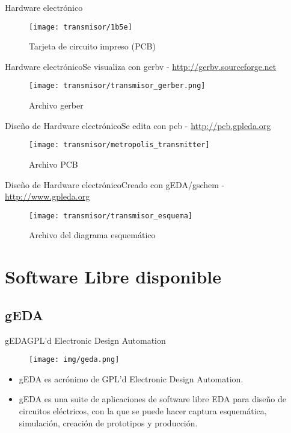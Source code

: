 \message{ !name(alternativa.tex)}\documentclass{beamer}
\begin{document}
\begin{frame}{Hardware electrónico}
  \begin{figure}
    \texttt{[image: transmisor/1b5e]}
    \caption{Tarjeta de circuito impreso (PCB)}
  \end{figure}
\end{frame}

\begin{frame}{Hardware electrónico}{Se visualiza con \alert{gerbv} - \url{http://gerbv.sourceforge.net}}
  \begin{figure}
    \texttt{[image: transmisor/transmisor\_gerber.png]}
    \caption{Archivo gerber}
  \end{figure}
\end{frame}

\begin{frame}{Diseño de Hardware electrónico}{Se edita con \alert{pcb} - \url{http://pcb.gpleda.org}}
  \begin{figure}
    \texttt{[image: transmisor/metropolis\_transmitter]}
    \caption{Archivo PCB}
  \end{figure}
\end{frame}

\begin{frame}{Diseño de Hardware electrónico}{Creado con \alert{gEDA/gschem} - \url{http://www.gpleda.org}}
  \begin{figure}
    \texttt{[image: transmisor/transmisor\_esquema]}
    \caption{Archivo del diagrama esquemático}
  \end{figure}
\end{frame}

\section{Software Libre disponible}

\subsection[gEDA - \url{http://www.gpleda.org}]{gEDA}

\begin{frame}{gEDA}{GPL'd Electronic Design Automation}
  \begin{figure}[!h]
    \centering
    \texttt{[image: img/geda.png]}
  \end{figure}
  \begin{itemize}
  \item gEDA es acrónimo de GPL'd Electronic Design Automation.
  \item gEDA es una suite de aplicaciones de software libre EDA para diseño de circuitos eléctricos, con la que se puede hacer captura esquemática, simulación, creación de prototipos y producción.
  \end{itemize}
\end{frame}
\end{document}
